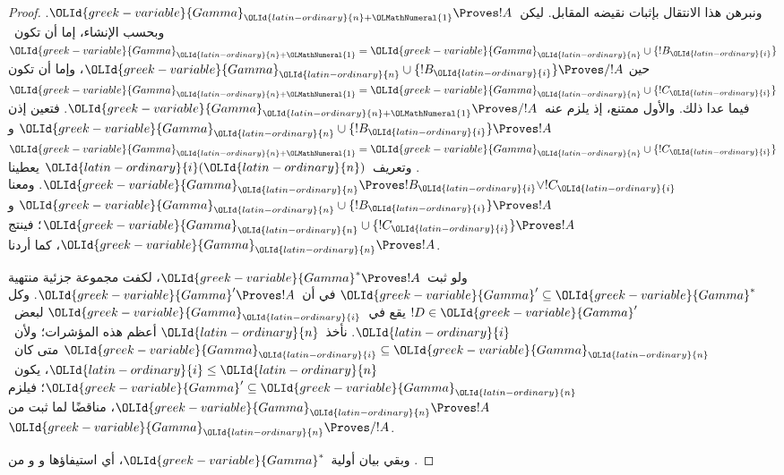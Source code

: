 \documentclass[../../../include/open-logic-section]{subfiles}
\begin{document}
\begin{proof}
  ونبرهن هذا الانتقال بإثبات نقيضه المقابل. ليكن~${\OLId{greek-variable}{Gamma}}_{{\OLId{latin-ordinary}{n}}+{\OLMathNumeral{1}}} \Proves !A$.
  وبحسب الإنشاء، إما أن تكون~${\OLId{greek-variable}{Gamma}}_{{\OLId{latin-ordinary}{n}}+{\OLMathNumeral{1}}}={\OLId{greek-variable}{Gamma}}_{\OLId{latin-ordinary}{n}}\cup\{!B_{\OLId{latin-ordinary}{i}}\}$ حين
  ${\OLId{greek-variable}{Gamma}}_{\OLId{latin-ordinary}{n}}\cup\{!B_{\OLId{latin-ordinary}{i}}\}\Proves/!A$، وإما أن تكون
  ${\OLId{greek-variable}{Gamma}}_{{\OLId{latin-ordinary}{n}}+{\OLMathNumeral{1}}}={\OLId{greek-variable}{Gamma}}_{\OLId{latin-ordinary}{n}}\cup\{!C_{\OLId{latin-ordinary}{i}}\}$ فيما عدا ذلك. والأول ممتنع، إذ
  يلزم عنه~${\OLId{greek-variable}{Gamma}}_{{\OLId{latin-ordinary}{n}}+{\OLMathNumeral{1}}}\Proves/!A$. فتعين إذن
  ${\OLId{greek-variable}{Gamma}}_{\OLId{latin-ordinary}{n}}\cup\{!B_{\OLId{latin-ordinary}{i}}\}\Proves !A$ و
  ${\OLId{greek-variable}{Gamma}}_{{\OLId{latin-ordinary}{n}}+{\OLMathNumeral{1}}}={\OLId{greek-variable}{Gamma}}_{\OLId{latin-ordinary}{n}}\cup\{!C_{\OLId{latin-ordinary}{i}}\}$. وتعريف~${\OLId{latin-ordinary}{i}}({\OLId{latin-ordinary}{n}})$ يعطينا
  ${\OLId{greek-variable}{Gamma}}_{\OLId{latin-ordinary}{n}}\Proves !B_{\OLId{latin-ordinary}{i}}\lor !C_{\OLId{latin-ordinary}{i}}$. ومعنا
  ${\OLId{greek-variable}{Gamma}}_{\OLId{latin-ordinary}{n}}\cup\{!B_{\OLId{latin-ordinary}{i}}\}\Proves !A$ و
  ${\OLId{greek-variable}{Gamma}}_{\OLId{latin-ordinary}{n}}\cup\{!C_{\OLId{latin-ordinary}{i}}\}\Proves !A$؛ فينتج
  ${\OLId{greek-variable}{Gamma}}_{\OLId{latin-ordinary}{n}}\Proves !A$، كما أردنا.

  ولو ثبت~${\OLId{greek-variable}{Gamma}}^* \Proves !A$، لكفت مجموعة جزئية منتهية
  ${\OLId{greek-variable}{Gamma}}'\subseteq{\OLId{greek-variable}{Gamma}}^*$ في أن~${\OLId{greek-variable}{Gamma}}'\Proves !A$. وكل
  $!D\in{\OLId{greek-variable}{Gamma}}'$ يقع في~${\OLId{greek-variable}{Gamma}}_{\OLId{latin-ordinary}{i}}$ لبعض~${\OLId{latin-ordinary}{i}}$. نأخذ~${\OLId{latin-ordinary}{n}}$ أعظم
  هذه المؤشرات؛ ولأن~${\OLId{greek-variable}{Gamma}}_{\OLId{latin-ordinary}{i}}\subseteq{\OLId{greek-variable}{Gamma}}_{\OLId{latin-ordinary}{n}}$ متى كان~${\OLId{latin-ordinary}{i}}\leq {\OLId{latin-ordinary}{n}}$،
  يكون~${\OLId{greek-variable}{Gamma}}'\subseteq{\OLId{greek-variable}{Gamma}}_{\OLId{latin-ordinary}{n}}$؛ فيلزم
  ${\OLId{greek-variable}{Gamma}}_{\OLId{latin-ordinary}{n}}\Proves !A$، مناقضًا لما ثبت من
  ${\OLId{greek-variable}{Gamma}}_{\OLId{latin-ordinary}{n}}\Proves/!A$.

  وبقي بيان أولية~${\OLId{greek-variable}{Gamma}}^*$، أي استيفاؤها
   و و من
  .


\end{proof}
\end{document}
